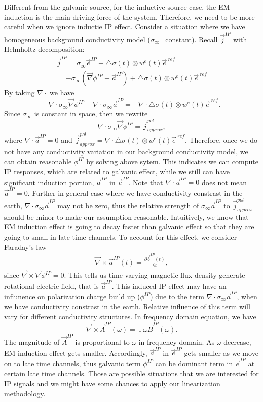 \documentclass[a4paper, 11pt]{article}
\renewcommand{\div}{\nabla\cdot}
\newcommand{\grad}{\vec \nabla}
\newcommand{\curl}{{\vec \nabla}\times}
\newcommand{\siginf}{\sigma_\infty}
\newcommand{\dsig}{\triangle\sigma}
\newcommand{\B}{\vec{B}}
\renewcommand {\j}  { {\vec j} }
\renewcommand {\b}  { {\vec b} }
\newcommand {\e}  { {\vec e} }
\begin{document}
Different from the galvanic source, for the inductive source case, the EM induction is the main driving force of the system. Therefore, we need to be more careful when we ignore inductie IP effect. Consider a situation where we have homogeneous background conductivity model ($\siginf$=constant). Recall $\j^{IP}$ with Helmholtz decomposition:
\begin{eqnarray*}
    \j^{IP} = \siginf\e^{IP} + \dsig(t)\otimes w^{e}(t)\e^{\ ref} \\
            = -\siginf(\grad\phi^{IP}+\vec{a}^{IP}) + \dsig(t)\otimes w^{e}(t)\e^{\ ref}
\end{eqnarray*}
By taking $\div$ we have
\begin{equation*}
    -\div\siginf\grad\phi^{IP}-\div\siginf\vec{a}^{IP} = -\div\dsig(t)\otimes w^{e}(t)\e^{\ ref}.
\end{equation*}
Since $\siginf$ is constant in space, then we rewrite
\begin{equation*}
    \div\siginf\grad\phi^{IP} = \j^{pol}_{approx},
\end{equation*}
where $\div\vec{a}^{IP}=0$ and $\j^{pol}_{approx}  = \div\dsig(t)\otimes w^{e}(t)\e^{\ ref}$. Therefore, once we do not have any conductivity variation in our background conductivity model, we can obtain reasonable $\phi^{IP}$ by solving above sytem. This indicates we can compute IP responses, which are related to galvanic effect, while we still can have significant induction portion, $\vec{a}^{IP}$ in $\e^{IP}$. Note that $\div\vec{a}^{IP}=0$ does not mean $\vec{a}^{IP}=0$. Further in general case where we have conductivity constrast in the earth, $\div \siginf \vec{a}^{IP}$ may not be zero, thus the relative strength of  $\siginf \vec{a}^{IP}$ to $\j^{pol}_{approx}$ should be minor to make our assumption reasonable. Intuitively, we know that EM induction effect is going to decay faster than galvanic effect so that they are going to small in late time channels. To account for this effect, we consider Faraday's law
\begin{eqnarray*}
    \curl \vec{a}^{IP}(t) = \frac{\partial \b^{IP}(t)}{\partial t},
\end{eqnarray*}
since $\curl \grad \phi^{IP} = 0$. This tells us time varying magnetic flux density generate rotational electric field, that is $\vec{a}^{IP}$. This induced IP effect may have an influnence on polarization charge build up ($\phi^{IP}$) due to the term $\div\siginf\vec{a}^{IP}$, when we have conductivity constrast in the earth. Relative influence of this term will vary for different conductivity structures. 
In frequency domain equation, we have
\begin{equation*}
    \curl \vec{A}^{IP}(\omega) = \imath\omega\B^{IP}(\omega).
\end{equation*}
The magnitude of $\vec{A}^{IP}$ is proportional to $\omega$ in frequency domain. As $\omega$ decrease, EM induction effect gets smaller. Accordingly, $\vec{a}^{IP}$ in $\e^{IP}$ gets smaller as we move on to late time channels, thus galvanic term $\phi^{IP}$ can be dominant term in $\e^{IP}$ at certain late time channels. Those are possible situations that we are interested for IP signals and we might have some chances to apply our linearization methodology.
\end{document}
